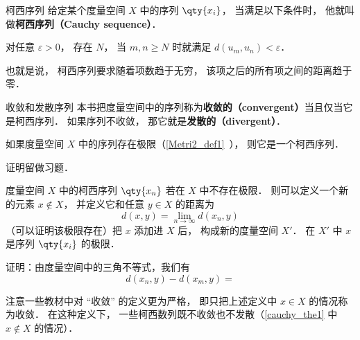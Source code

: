 

\begin{definition}{柯西序列}
给定某个度量空间 $X$ 中的序列 $\qty{x_i}$， 当满足以下条件时， 他就叫做\textbf{柯西序列（Cauchy sequence）}．

对任意 $\varepsilon > 0$， 存在 $N$， 当 $m, n \geqslant N$ 时就满足 $d(u_m, u_n) < \varepsilon$．
\end{definition}
也就是说， 柯西序列要求随着项数趋于无穷， 该项之后的所有项之间的距离趋于零．

\begin{definition}{收敛和发散序列}\label{cauchy_def1}
本书把度量空间中的序列称为\textbf{收敛的（convergent）}当且仅当它是柯西序列． 如果序列不收敛， 那它就是\textbf{发散的（divergent）}．
\end{definition}

\begin{theorem}{}
如果度量空间 $X$ 中的序列存在极限（\autoref{Metri2_def1}~）， 则它是一个柯西序列．
\end{theorem}
证明留做习题．

\begin{theorem}{}\label{cauchy_the1}
度量空间 $X$ 中的柯西序列 $\qty{x_n}$ 若在 $X$ 中不存在极限． 则可以定义一个新的元素 $x \notin X$， 并定义它和任意 $y\in X$ 的距离为
\begin{equation}
d(x, y) = \lim_{n\to\infty} d(x_n, y)
\end{equation}
（可以证明该极限存在）把 $x$ 添加进 $X$ 后， 构成新的度量空间 $X'$． 在 $X'$ 中 $x$ 是序列 $\qty{x_i}$ 的极限．
\end{theorem}
证明：由度量空间中的三角不等式，我们有
\begin{equation}
d(x_n,y)-d(x_m,y)=
\end{equation}

注意一些教材中对 “收敛” 的定义更为严格， 即只把上述定义中 $x \in X$ 的情况称为收敛． 在这种定义下， 一些柯西数列既不收敛也不发散（\autoref{cauchy_the1} 中 $x\notin X$ 的情况）．




